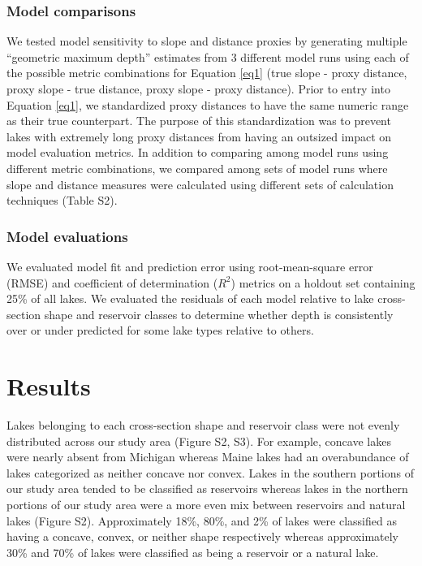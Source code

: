 \documentclass[draft]{agujournal2019}
\begin{document}
\subsubsection{Model comparisons}
\noindent
We tested model sensitivity to slope and distance proxies by generating multiple “geometric maximum depth” estimates from 3 different model runs using each of the possible metric combinations for Equation \ref{eq1} (true slope - proxy distance, proxy slope - true distance, proxy slope - proxy distance). Prior to entry into Equation \ref{eq1}, we standardized proxy distances to have the same numeric range as their true counterpart. The purpose of this standardization was to prevent lakes with extremely long proxy distances from having an outsized impact on model evaluation metrics. In addition to comparing among model runs using different metric combinations, we compared among sets of model runs where slope and distance measures were calculated using different sets of calculation techniques (Table S2).

\subsubsection{Model evaluations}
\noindent
We evaluated model fit and prediction error using root-mean-square error (RMSE) and coefficient of determination ($R^2$) metrics on a holdout set containing 25\% of all lakes. We evaluated the residuals of each model relative to lake cross-section shape and reservoir classes to determine whether depth is consistently over or under predicted for some lake types relative to others.

\section{Results}
\noindent
Lakes belonging to each cross-section shape and reservoir class were not evenly distributed across our study area (Figure S2, S3). For example, concave lakes were nearly absent from Michigan whereas Maine lakes had an overabundance of lakes categorized as neither concave nor convex. Lakes in the southern portions of our study area tended to be classified as reservoirs whereas lakes in the northern portions of our study area were a more even mix between reservoirs and natural lakes (Figure S2). Approximately 18\%, 80\%, and 2\% of lakes were classified as having a concave, convex, or neither shape respectively whereas approximately 30\% and 70\% of lakes were classified as being a reservoir or a natural lake.
\end{document}
